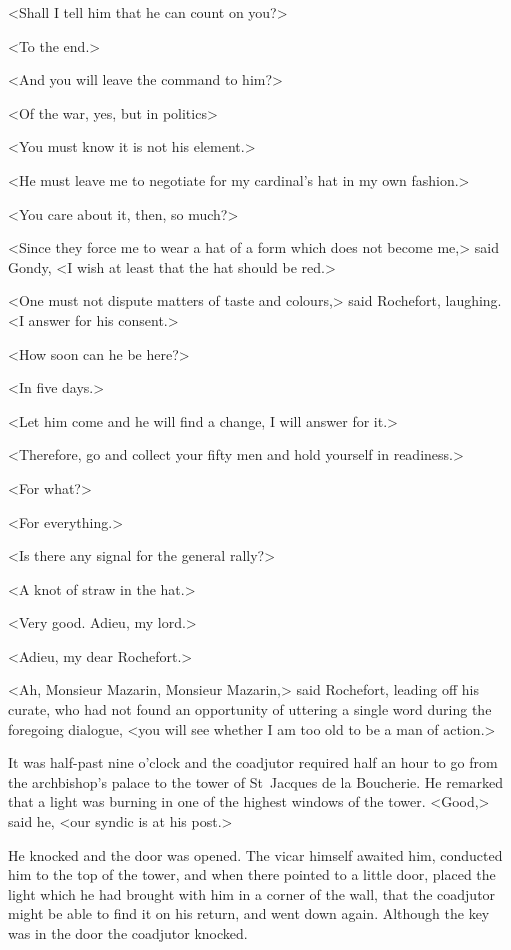 <Shall I tell him that he can count on you?>

<To the end.>

<And you will leave the command to him?>

<Of the war, yes, but in politics\longdash>

<You must know it is not his element.>

<He must leave me to negotiate for my cardinal's hat in my own fashion.>

<You care about it, then, so much?>

<Since they force me to wear a hat of a form which does not become me,> said Gondy, <I wish at least that the hat should be red.>

<One must not dispute matters of taste and colours,> said Rochefort, laughing. <I answer for his consent.>

<How soon can he be here?>

<In five days.>

<Let him come and he will find a change, I will answer for it.>

<Therefore, go and collect your fifty men and hold yourself in readiness.>

<For what?>

<For everything.>

<Is there any signal for the general rally?>

<A knot of straw in the hat.>

<Very good. Adieu, my lord.>

<Adieu, my dear Rochefort.>

<Ah, Monsieur Mazarin, Monsieur Mazarin,> said Rochefort, leading off his curate, who had not found an opportunity of uttering a single word during the foregoing dialogue, <you will see whether I am too old to be a man of action.>

It was half-past nine o'clock and the coadjutor required half an hour to go from the archbishop's palace to the tower of St~Jacques de la Boucherie. He remarked that a light was burning in one of the highest windows of the tower. <Good,> said he, <our syndic is at his post.>

He knocked and the door was opened. The vicar himself awaited him, conducted him to the top of the tower, and when there pointed to a little door, placed the light which he had brought with him in a corner of the wall, that the coadjutor might be able to find it on his return, and went down again. Although the key was in the door the coadjutor knocked.

